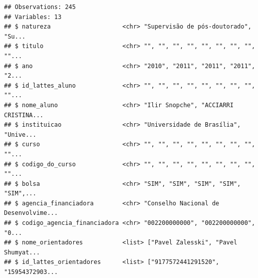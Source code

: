 \documentclass[]{article}
\newenvironment{Shaded}{\begin{snugshade}}{\end{snugshade}}
\newcommand{\KeywordTok}[1]{\textcolor[rgb]{0.13,0.29,0.53}{\textbf{#1}}}
\newcommand{\DataTypeTok}[1]{\textcolor[rgb]{0.13,0.29,0.53}{#1}}
\newcommand{\CharTok}[1]{\textcolor[rgb]{0.31,0.60,0.02}{#1}}
\newcommand{\StringTok}[1]{\textcolor[rgb]{0.31,0.60,0.02}{#1}}
\newcommand{\CommentTok}[1]{\textcolor[rgb]{0.56,0.35,0.01}{\textit{#1}}}
\newcommand{\OperatorTok}[1]{\textcolor[rgb]{0.81,0.36,0.00}{\textbf{#1}}}
\newcommand{\NormalTok}[1]{#1}
\begin{document}
\begin{verbatim}
## Observations: 245
## Variables: 13
## $ natureza                    <chr> "Supervisão de pós-doutorado", "Su...
## $ titulo                      <chr> "", "", "", "", "", "", "", "", ""...
## $ ano                         <chr> "2010", "2011", "2011", "2011", "2...
## $ id_lattes_aluno             <chr> "", "", "", "", "", "", "", "", ""...
## $ nome_aluno                  <chr> "Ilir Snopche", "ACCIARRI CRISTINA...
## $ instituicao                 <chr> "Universidade de Brasília", "Unive...
## $ curso                       <chr> "", "", "", "", "", "", "", "", ""...
## $ codigo_do_curso             <chr> "", "", "", "", "", "", "", "", ""...
## $ bolsa                       <chr> "SIM", "SIM", "SIM", "SIM", "SIM",...
## $ agencia_financiadora        <chr> "Conselho Nacional de Desenvolvime...
## $ codigo_agencia_financiadora <chr> "002200000000", "002200000000", "0...
## $ nome_orientadores           <list> ["Pavel Zalesski", "Pavel Shumyat...
## $ id_lattes_orientadores      <list> ["9177572441291520", "15954372903...
\end{verbatim}

\begin{Shaded}
\end{Shaded}
\end{document}
